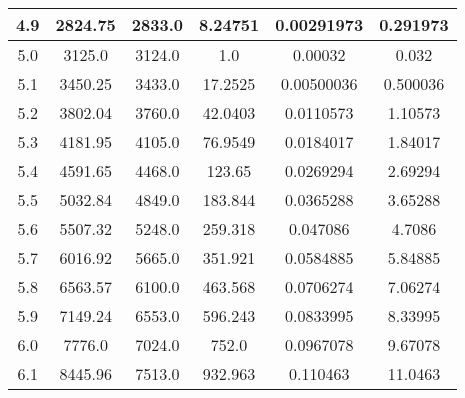 \begin{table}[h!]
\begin{tabular}{|c|c|c|c|c|c|}
        4.9        & 2824.75        & 2833.0                            & 8.24751      & 0.00291973        & 0.291973          \\ \hline
        5.0        & 3125.0         & 3124.0                            & 1.0          & 0.00032           & 0.032             \\ \hline
        5.1        & 3450.25        & 3433.0                            & 17.2525      & 0.00500036        & 0.500036          \\ \hline
        5.2        & 3802.04        & 3760.0                            & 42.0403      & 0.0110573         & 1.10573           \\ \hline
        5.3        & 4181.95        & 4105.0                            & 76.9549      & 0.0184017         & 1.84017           \\ \hline
        5.4        & 4591.65        & 4468.0                            & 123.65       & 0.0269294         & 2.69294           \\ \hline
        5.5        & 5032.84        & 4849.0                            & 183.844      & 0.0365288         & 3.65288           \\ \hline
        5.6        & 5507.32        & 5248.0                            & 259.318      & 0.047086          & 4.7086            \\ \hline
        5.7        & 6016.92        & 5665.0                            & 351.921      & 0.0584885         & 5.84885           \\ \hline
        5.8        & 6563.57        & 6100.0                            & 463.568      & 0.0706274         & 7.06274           \\ \hline
        5.9        & 7149.24        & 6553.0                            & 596.243      & 0.0833995         & 8.33995           \\ \hline
        6.0        & 7776.0         & 7024.0                            & 752.0        & 0.0967078         & 9.67078           \\ \hline
        6.1        & 8445.96        & 7513.0                            & 932.963      & 0.110463          & 11.0463           \\ \hline
    \end{tabular}\label{tab:table2}
\end{table}
